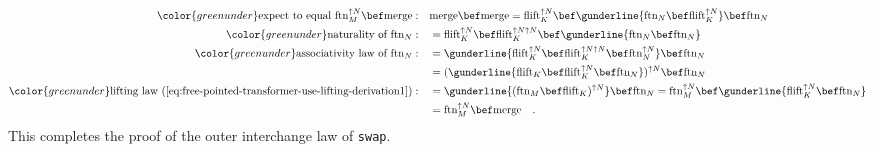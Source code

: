 \begin{align*}
{\color{greenunder}\text{expect to equal }\text{ftn}_{M}^{\uparrow N}\bef\text{merge}:}\quad & \text{merge}\bef\text{merge}=\text{flift}_{K}^{\uparrow N}\bef\gunderline{\text{ftn}_{N}\bef\text{flift}_{K}^{\uparrow N}}\bef\text{ftn}_{N}\\
{\color{greenunder}\text{naturality of }\text{ftn}_{N}:}\quad & =\text{flift}_{K}^{\uparrow N}\bef\text{flift}_{K}^{\uparrow N\uparrow N}\bef\gunderline{\text{ftn}_{N}\bef\text{ftn}_{N}}\\
{\color{greenunder}\text{associativity law of }\text{ftn}_{N}:}\quad & =\gunderline{\text{flift}_{K}^{\uparrow N}\bef\text{flift}_{K}^{\uparrow N\uparrow N}\bef\text{ftn}_{N}^{\uparrow N}}\bef\text{ftn}_{N}\\
 & =(\gunderline{\text{flift}_{K}\bef\text{flift}_{K}^{\uparrow N}\bef\text{ftn}_{N}})^{\uparrow N}\bef\text{ftn}_{N}\\
{\color{greenunder}\text{lifting law~(\ref{eq:free-pointed-transformer-use-lifting-derivation1})}:}\quad & =\gunderline{(\text{ftn}_{M}\bef\text{flift}_{K})^{\uparrow N}}\bef\text{ftn}_{N}=\text{ftn}_{M}^{\uparrow N}\bef\gunderline{\text{flift}_{K}^{\uparrow N}\bef\text{ftn}_{N}}\\
 & =\text{ftn}_{M}^{\uparrow N}\bef\text{merge}\quad.
\end{align*}
This completes the proof of the outer interchange law of \lstinline!swap!.

